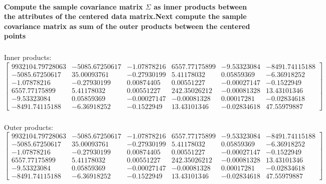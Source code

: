 \documentclass{article}
\begin{document}
\paragraph{Compute the sample covariance matrix $\Sigma$ as inner products between the attributes of the centered data matrix.Next compute the sample covariance matrix as sum of the outer products between the centered points}
\subparagraph{}Inner products:\[ 
\begin{bmatrix}9932104.79728063   & -5085.67250617   &    -1.07878216    & 6557.77175899
     &   -9.53323084  &  -8491.74115188\\
  -5085.67250617    &   35.00093761     &  -0.27930199     &   5.41178032
      &   0.05859369      & -6.36918252\\
    -1.07878216     &  -0.27930199      &  0.00874405       & 0.00551227
       & -0.00027147     &  -0.1522949 \\
   6557.77175899   &     5.41178032   &     0.00551227   &   242.35026212
     &   -0.00081328  &     13.43101346\\
       -9.53323084& 0.05859369& -0.00027147& -0.00081328
& 0.00017281& -0.02834618\\
  -8491.74115188&       -6.36918252  &     -0.1522949 &       13.43101346
    &    -0.02834618    &   47.55979887\end{bmatrix}\]
\subparagraph{}Outer products:\[ 
\begin{bmatrix}9932104.79728063   & -5085.67250617   &    -1.07878216    & 6557.77175899
     &   -9.53323084  &  -8491.74115188\\
  -5085.67250617    &   35.00093761     &  -0.27930199     &   5.41178032
      &   0.05859369      & -6.36918252\\
    -1.07878216     &  -0.27930199      &  0.00874405       & 0.00551227
       & -0.00027147     &  -0.1522949 \\
   6557.77175899   &     5.41178032   &     0.00551227   &   242.35026212
     &   -0.00081328  &     13.43101346\\
       -9.53323084& 0.05859369& -0.00027147& -0.00081328
& 0.00017281& -0.02834618\\
  -8491.74115188&       -6.36918252  &     -0.1522949 &       13.43101346
    &    -0.02834618    &   47.55979887\end{bmatrix}\]
\end{document}
